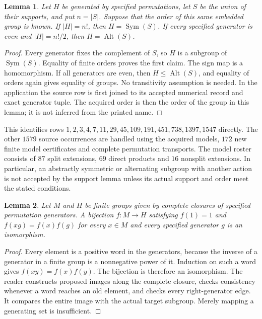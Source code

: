 \documentclass[11pt]{article}
\newtheorem{lemma}{Lemma}
\begin{document}
\begin{lemma}
Let $H$ be generated by specified permutations, let $S$ be the union of
their supports, and put $n=|S|$. Suppose that the order of this same
embedded group is known. If $|H|=n!$, then $H=\operatorname{Sym}(S)$.
If every specified generator is even and $|H|=n!/2$, then
$H=\operatorname{Alt}(S)$.
\end{lemma}
\begin{proof}
Every generator fixes the complement of $S$, so $H$ is a subgroup of
$\operatorname{Sym}(S)$. Equality of finite orders proves the first claim.
The sign map is a homomorphism. If all generators are even, then
$H\leq\operatorname{Alt}(S)$, and equality of orders again gives equality
of groups. No transitivity assumption is needed. In the application the
source row is first joined to its accepted numerical record and exact
generator tuple. The acquired order is then the order of the group in
this lemma; it is not inferred from the printed name.
\end{proof}

This identifies rows
$1,2,3,4,7,11,29,45,109,191,451,738,1397,1547$ directly.
The other $1579$ source occurrences are handled using the acquired
models, $172$ new finite model certificates and complete permutation
transports. The model roster consists
of $87$ split extensions, $69$ direct products and $16$ nonsplit extensions. In particular, an
abstractly symmetric or alternating subgroup with another action is not
accepted by the support lemma unless its actual support and order meet
the stated conditions.

\begin{lemma}
Let $M$ and $H$ be finite groups given by complete closures of specified
permutation generators. A bijection $f:M\to H$ satisfying $f(1)=1$ and
$f(xg)=f(x)f(g)$ for every $x\in M$ and every specified generator $g$
is an isomorphism.
\end{lemma}
\begin{proof}
Every element is a positive word in the generators, because the inverse
of a generator in a finite group is a nonnegative power of it. Induction
on such a word gives $f(xy)=f(x)f(y)$. The bijection is therefore an
isomorphism. The reader constructs proposed images along the complete
closure, checks consistency whenever a word reaches an old element, and
checks every right-generator edge. It compares the entire image with the
actual target subgroup. Merely mapping a generating set is insufficient.
\end{proof}
\end{document}
